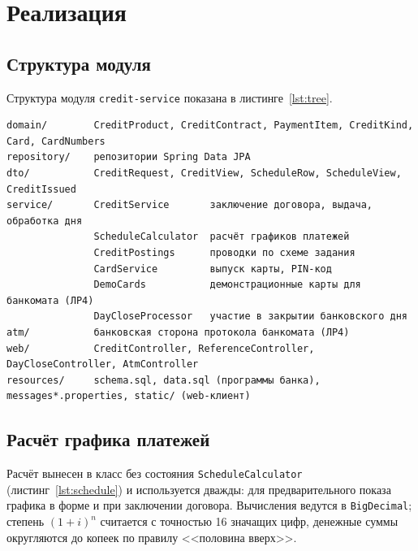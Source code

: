 \documentclass[14pt,a4paper]{extarticle}
\begin{document}
\section{Реализация}

\subsection{Структура модуля}

Структура модуля \texttt{credit-service} показана в листинге~\ref{lst:tree}.

\begin{Verbatim}[fontsize=\footnotesize, frame=single, rulecolor=\color{codeframe}]
domain/        CreditProduct, CreditContract, PaymentItem, CreditKind, Card, CardNumbers
repository/    репозитории Spring Data JPA
dto/           CreditRequest, CreditView, ScheduleRow, ScheduleView, CreditIssued
service/       CreditService       заключение договора, выдача, обработка дня
               ScheduleCalculator  расчёт графиков платежей
               CreditPostings      проводки по схеме задания
               CardService         выпуск карты, PIN-код
               DemoCards           демонстрационные карты для банкомата (ЛР4)
               DayCloseProcessor   участие в закрытии банковского дня
atm/           банковская сторона протокола банкомата (ЛР4)
web/           CreditController, ReferenceController, DayCloseController, AtmController
resources/     schema.sql, data.sql (программы банка), messages*.properties, static/ (web-клиент)
\end{Verbatim}

\subsection{Расчёт графика платежей}

Расчёт вынесен в класс без состояния \texttt{ScheduleCalculator}
(листинг~\ref{lst:schedule}) и используется дважды: для предварительного показа графика в
форме и при заключении договора. Вычисления ведутся в \texttt{BigDecimal}; степень
$(1 + i)^n$ считается с точностью 16 значащих цифр, денежные суммы округляются до копеек по
правилу <<половина вверх>>.
\end{document}
